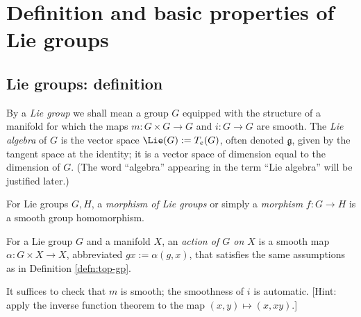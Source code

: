 \documentclass[reqno]{amsart} 
\begin{document}
\section{Definition and basic properties of Lie groups}
\label{sec:orgfa95dc3}
\subsection{Lie groups: definition}
\label{sec:org11b4fd5}
\begin{definition}\label{defn:lie-group}
  By a \emph{Lie group} we shall mean a group $G$ equipped with
  the structure of a manifold for which the maps
  $m : G \times G \rightarrow G$ and $i : G \rightarrow G$ are
  smooth.  The \emph{Lie algebra} of $G$ is the vector space
  $\Lie(G) := T_e(G)$, often denoted $\mathfrak{g}$, given by
  the tangent space at the identity; it is a vector space of
  dimension equal to the dimension of $G$.
  (The word ``algebra'' appearing in the term ``Lie
  algebra''
  will be justified later.)

  For Lie groups $G, H$,
  a \emph{morphism of Lie groups} or simply a \emph{morphism} $f : G \rightarrow H$
  is a smooth group homomorphism.

  For a Lie group $G$ and a manifold $X$,
  an \emph{action of $G$ on $X$}
  is a smooth map $\alpha : G \times X \rightarrow X$,
  abbreviated $g x := \alpha(g,x)$,
  that satisfies the same assumptions as in Definition \ref{defn:top-gp}.
\end{definition}

\begin{exercise}
  It suffices to check that $m$ is smooth; the
  smoothness of $i$ is automatic. [Hint: apply the inverse function theorem  to the map $(x,y) \mapsto (x,x y)$.]
\end{exercise}
\end{document}
